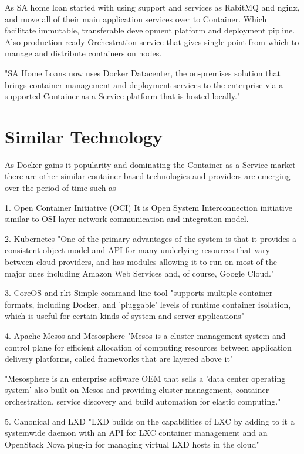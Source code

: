 \documentclass{acm_proc_article-sp}
\begin{document}
As SA home loan started with using support and services as RabitMQ and nginx, and move all of their main application services over to Container. Which facilitate immutable, transferable development platform and deployment pipline. Also production ready Orchestration service that gives single point from which to manage and distribute containers on nodes.

"SA Home Loans now uses Docker Datacenter, the on-premises solution that brings container management and deployment services to the enterprise via a supported Container-as-a-Service platform that is hosted locally."
\cite{SA}

\section{Similar Technology}
As Docker gains it popularity and dominating the Container-as-a-Service market there are other similar container based technologies and providers are emerging over the period of time such as

1.	Open Container Initiative (OCI)
It is Open System Interconnection initiative similar to OSI layer network communication and integration model. 

2.	Kubernetes
"One of the primary advantages of the system is that it provides a consistent object model and API for many underlying resources that vary between cloud providers, and has modules allowing it to run on most of the major ones including Amazon Web Services and, of course, Google Cloud."

3.	CoreOS and rkt
Simple command-line tool "supports multiple container formats, including Docker, and 'pluggable' levels of runtime container isolation, which is useful for certain kinds of system and server applications"

4.	Apache Mesos and Mesosphere
"Mesos is a cluster management system and control plane for efficient allocation of computing resources between application delivery platforms, called frameworks that are layered above it"

"Mesosphere is an enterprise software OEM that sells a 'data center operating system' also built on Mesos and providing cluster management, container orchestration, service discovery and build automation for elastic computing."

5.	Canonical and LXD
"LXD builds on the capabilities of LXC by adding to it a systemwide daemon with an API for LXC container management and an OpenStack Nova plug-in for managing virtual LXD hosts in the cloud"
\cite{Alternate-Container}
\end{document}
